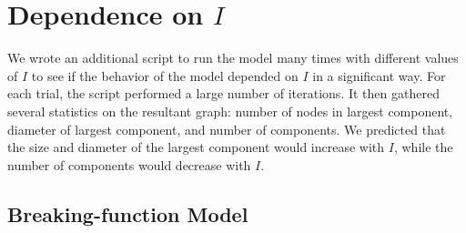 \documentclass[a4paper,10pt]{article}
\begin{document}
\section{Dependence on $I$}

We wrote an additional script to run the model many times with different values of $I$ to see if the behavior of the model depended on $I$ in a significant way. For each trial, the script performed a large number of iterations. It then gathered several statistics on the resultant graph: number of nodes in largest component, diameter of largest component, and number of components. We predicted that the size and diameter of the largest component would increase with $I$, while the number of components would decrease with $I$. 

\subsection{Breaking-function Model}
\end{document}
